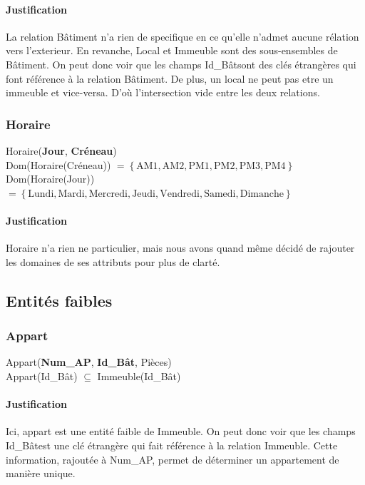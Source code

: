 \documentclass[a4paper, 12pt]{article}
\begin{document}
                \paragraph{Justification}La relation Bâtiment n'a rien de specifique en ce qu'elle n'admet aucune rélation vers l'exterieur. En revanche, Local et Immeuble sont des sous-ensembles de Bâtiment. On peut donc voir que les champs \og Id\_Bât\fg sont des clés étrangères qui font référence à la relation Bâtiment. De plus, un local ne peut pas etre un immeuble et vice-versa. D'où l'intersection vide entre les deux relations.


                \subsubsection{Horaire}
                \noindent Horaire(\textbf{Jour}, \textbf{Créneau}) \\
                Dom(Horaire(Créneau)) $= \left\{\text{AM1}, \text{AM2}, \text{PM1}, \text{PM2}, \text{PM3}, \text{PM4}\right\}$ \\
                Dom(Horaire(Jour)) $= \left\{\text{Lundi}, \text{Mardi}, \text{Mercredi}, \text{Jeudi}, \text{Vendredi}, \text{Samedi}, \text{Dimanche}\right\}$ 

                \paragraph{Justification}Horaire n'a rien ne particulier, mais nous avons quand même décidé de rajouter les domaines de ses attributs pour plus de clarté.
            
            \subsection{Entités faibles}
                
            
                \subsubsection{Appart}
                \noindent Appart(\textbf{Num\_AP}, \textbf{Id\_Bât}, Pièces) \\
                Appart(Id\_Bât) $\subseteq$ Immeuble(Id\_Bât)
                \paragraph{Justification}Ici, appart est une entité faible de Immeuble. On peut donc voir que les champs \og Id\_Bât\fg est une clé étrangère qui fait référence à la relation Immeuble. Cette information, rajoutée à Num\_AP, permet de déterminer un appartement de manière unique. 
            
\end{document}
